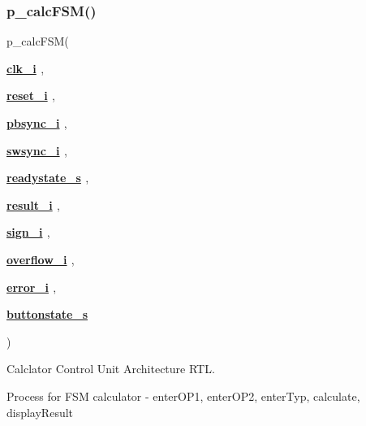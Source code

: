 \subsubsection{\texorpdfstring{p\+\_\+calc\+F\+S\+M()}{p\_calcFSM()}}
{\footnotesize\ttfamily  {\bfseries \textcolor{vhdlchar}{ }} p\+\_\+calc\+F\+SM(\begin{DoxyParamCaption}\item[{}]{{\bfseries {\bfseries \hyperlink{classcalc__ctrl_abe949478e3f8aad0a6aeb1842fa6c608}{clk\+\_\+i}} \textcolor{vhdlchar}{ }} {\em } ,  }\item[{}]{{\bfseries {\bfseries \hyperlink{classcalc__ctrl_a55da7e76960757f8c6842e86a28ee7be}{reset\+\_\+i}} \textcolor{vhdlchar}{ }} {\em } ,  }\item[{}]{{\bfseries {\bfseries \hyperlink{classcalc__ctrl_ac9ed06cffb254d885992bb8fb780e8e6}{pbsync\+\_\+i}} \textcolor{vhdlchar}{ }} {\em } ,  }\item[{}]{{\bfseries {\bfseries \hyperlink{classcalc__ctrl_a8f274a58bd077b3f0604e897f5fd8d06}{swsync\+\_\+i}} \textcolor{vhdlchar}{ }} {\em } ,  }\item[{}]{{\bfseries {\bfseries \hyperlink{classcalc__ctrl_1_1rtl_a3e1f575cd6ec8066c23692c007e16457}{readystate\+\_\+s}} \textcolor{vhdlchar}{ }} {\em } ,  }\item[{}]{{\bfseries {\bfseries \hyperlink{classcalc__ctrl_a58aeef44e9161ee5cb7cc149ac8ee71a}{result\+\_\+i}} \textcolor{vhdlchar}{ }} {\em } ,  }\item[{}]{{\bfseries {\bfseries \hyperlink{classcalc__ctrl_a36cce5b89625a8867788d2fddddd19fd}{sign\+\_\+i}} \textcolor{vhdlchar}{ }} {\em } ,  }\item[{}]{{\bfseries {\bfseries \hyperlink{classcalc__ctrl_a3844e90f5dc89f02aa3b92d8ca978cfd}{overflow\+\_\+i}} \textcolor{vhdlchar}{ }} {\em } ,  }\item[{}]{{\bfseries {\bfseries \hyperlink{classcalc__ctrl_a43d5e6363af801d5112bf95b65cf682a}{error\+\_\+i}} \textcolor{vhdlchar}{ }} {\em } ,  }\item[{}]{{\bfseries {\bfseries \hyperlink{classcalc__ctrl_1_1rtl_af28493abe45f5efc5d9964a4858da804}{buttonstate\+\_\+s}} \textcolor{vhdlchar}{ }} {\em } }\end{DoxyParamCaption})\hspace{0.3cm}{\ttfamily [Process]}}



Calclator Control Unit Architecture R\+TL. 

Process for F\+SM calculator -\/ enter\+O\+P1, enter\+O\+P2, enter\+Typ, calculate, display\+Result 

